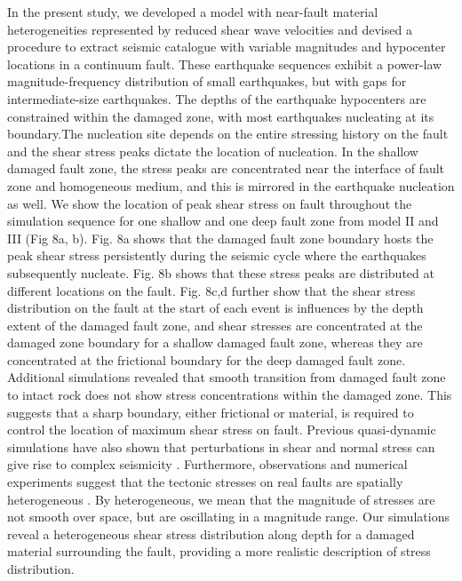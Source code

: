 \documentclass[11pt]{article}
\begin{document}
In the present study, we developed a model with near-fault material heterogeneities represented by reduced shear wave velocities and devised a procedure to extract seismic catalogue with variable magnitudes and hypocenter locations in a continuum fault. These earthquake sequences exhibit a power-law magnitude-frequency distribution of small earthquakes, but with gaps for intermediate-size earthquakes. The depths of the earthquake hypocenters are constrained within the damaged zone, with most earthquakes nucleating at its boundary.The nucleation site depends on the entire stressing history on the fault and the shear stress peaks dictate the location of nucleation. In the shallow damaged fault zone, the stress peaks are concentrated near the interface of fault zone and homogeneous medium, and this is mirrored in the earthquake nucleation as well. We show the location of peak shear stress on fault throughout the simulation sequence for one shallow and one deep fault zone from model II and III (Fig 8a, b). Fig. 8a shows that the damaged fault zone boundary hosts the peak shear stress persistently during the seismic cycle where the earthquakes subsequently nucleate. Fig. 8b shows that these stress peaks are distributed at different locations on the fault. Fig. 8c,d further show that the shear stress distribution on the fault at the start of each event is influences by the depth extent of the damaged fault zone, and shear stresses are concentrated at the damaged zone boundary for a shallow damaged fault zone, whereas they are concentrated at the frictional boundary for the deep damaged fault zone. Additional simulations revealed that smooth transition from damaged fault zone to intact rock does not show stress concentrations within the damaged zone. This suggests that a sharp boundary, either frictional or material, is required to control the location of maximum shear stress on fault. Previous quasi-dynamic simulations have also shown that perturbations in shear and normal stress can give rise to complex seismicity \citep{benzion_2001, perfettini_2003}. Furthermore, observations and numerical experiments suggest that the tectonic stresses on real faults are spatially heterogeneous \citep{townend_zoback_2000, rivera_kanamori_2002}. By heterogeneous, we mean that the magnitude of stresses are not smooth over space, but are oscillating in a magnitude range. Our simulations reveal a heterogeneous shear stress distribution along depth for a damaged material surrounding the fault, providing a more realistic description of stress distribution.
\end{document}
